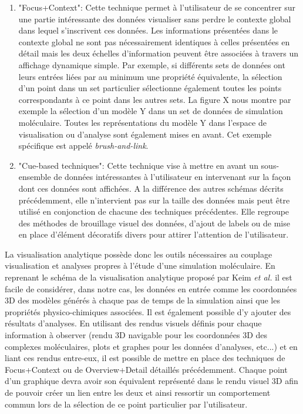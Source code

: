 \begin{enumerate}
    \item "Focus+Context": Cette technique permet à l'utilisateur de se concentrer sur une partie intéressante des données visualiser sans perdre le contexte global dans lequel s'inscrivent ces données. Les informations présentées dans le contexte global ne sont pas nécessairement identiques à celles présentées en détail mais les deux échelles d'information peuvent être associées à travers un affichage dynamique simple. Par exemple, si différents sets de données ont leurs entrées liées par au minimum une propriété équivalente, la sélection d'un point dans un set particulier sélectionne également toutes les points correspondants à ce point dans les autres sets. La figure X nous montre par exemple la sélection d'un modèle Y dans un set de données de simulation moléculaire. Toutes les représentations du modèle Y dans l'espace de visualisation ou d'analyse sont également mises en avant. Cet exemple spécifique est appelé \textit{brush-and-link}.
    \item "Cue-based techniques": Cette technique vise à mettre en avant un sous-ensemble de données intéressantes à l'utilisateur en intervenant sur la façon dont ces données sont affichées. A la différence des autres schémas décrits précédemment, elle n'intervient pas sur la taille des données mais peut être utilisé en conjonction de chacune des techniques précédentes. Elle regroupe des méthodes de brouillage visuel des données, d'ajout de labels ou de mise en place d'élément décoratifs divers pour attirer l'attention de l'utilisateur.
\end{enumerate}

La visualisation analytique possède donc les outils nécessaires au couplage visualisation et analyses propres à l'étude d'une simulation moléculaire. En reprenant le schéma de la visualisation analytique proposé par Keim \textit{et al.} il est facile de considérer, dans notre cas, les données en entrée comme les coordonnées 3D des modèles générés à chaque pas de temps de la simulation ainsi que les propriétés physico-chimiques associées. Il est également possible d'y ajouter des résultats d'analyses. En utilisant des rendus visuels définis pour chaque information à observer (rendu 3D navigable pour les coordonnées 3D des complexes moléculaires, plots et graphes pour les données d'analyses, etc...) et en liant ces rendus entre-eux, il est possible de mettre en place des techniques de Focus+Context ou de Overview+Detail détaillés précédemment. Chaque point d'un graphique devra avoir son équivalent représenté dans le rendu visuel 3D afin de pouvoir créer un lien entre les deux et ainsi ressortir un comportement commun lors de la sélection de ce point particulier par l'utilisateur.

